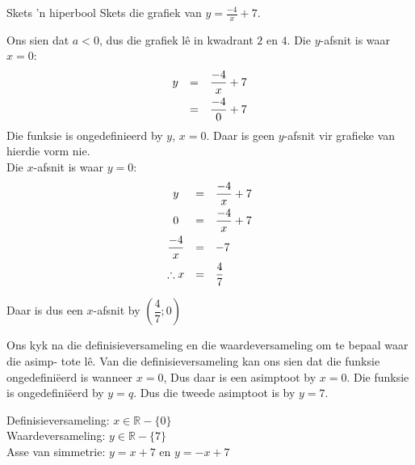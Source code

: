 \begin{wex}
{Skets ’n hiperbool}
{
Skets die grafiek van $y=\frac{-4}{x}+7$.}
{

Ons sien dat $a<0$, dus die grafiek l\^e in kwadrant $2$ en $4$.
Die $y$-afsnit is waar $x=0$:
\begin{equation*}
 \begin{array}{ccc}
 \hfill  y &= & \dfrac{-4}{x}+7 \vspace{4pt}\hfill \\
 \hfill &= & \dfrac {-4}{0} +7  \hfill \\

 \end{array}
\end{equation*}
Die funksie is ongedefinieerd by $y$, $x=0$. Daar is geen $y$-afsnit vir grafieke van hierdie vorm nie. \\
Die $x$-afsnit is waar $y=0$:
\begin{equation*}
 \begin{array}{ccl}
 y &=&  \dfrac{-4}{x}+7\vspace{4pt}\\
 0 &=&  \dfrac{-4}{x}+7\vspace{4pt}\\ 
 \dfrac{-4}{x} &=& -7\vspace{4pt} \\
\therefore x &= &\dfrac{4}{7}
 \end{array}
\end{equation*}

Daar is dus een $x$-afsnit by $\left(\dfrac{4}{7};0\right)$


Ons kyk na die definisieversameling en die waardeversameling om te bepaal waar die asimp-
tote lê. Van die definisieversameling kan ons sien dat die funksie ongedefiniëerd
is wanneer $x=0$, Dus daar is een asimptoot by $x=0$. Die funksie is
ongedefiniëerd by $ y = q$. Dus die tweede asimptoot is by $y=7$. 

\setcounter{subfigure}{0}
\begin{center}
\end{center}

Definisieversameling: $x \in \mathbb{R} - \{0\}$\\
Waardeversameling: $y \in \mathbb{R} - \{7\}$\\
Asse van simmetrie: $y=x+7$ en $y=-x+7$


}
\end{wex}

